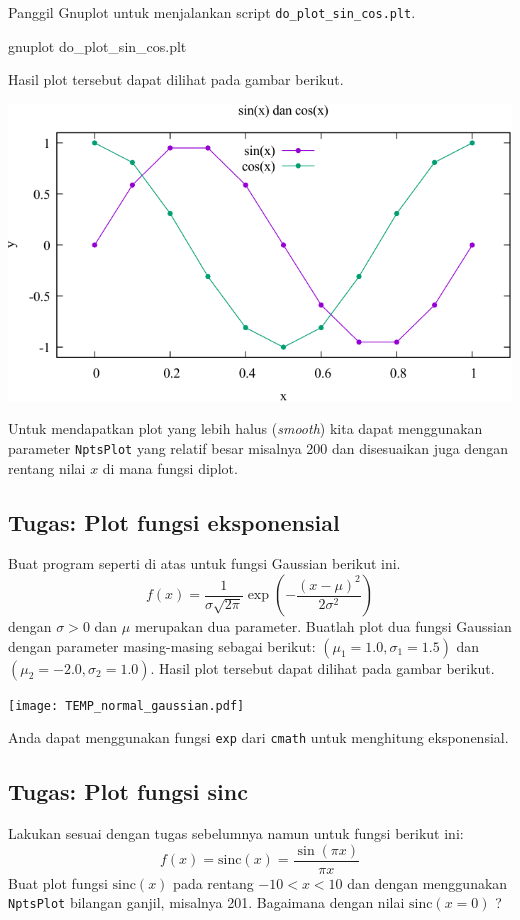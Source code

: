 \documentclass[a4paper,11pt]{extarticle}
\begin{document}
Panggil \textsf{Gnuplot} untuk menjalankan script \texttt{do\_plot\_sin\_cos.plt}.
\begin{textcode}
gnuplot do_plot_sin_cos.plt
\end{textcode}

Hasil plot tersebut dapat dilihat pada gambar berikut.

{\centering
\includegraphics[scale=1.0]{sin_cos.pdf}
\par
}

Untuk mendapatkan plot yang lebih halus (\textit{smooth}) kita dapat menggunakan
parameter \texttt{NptsPlot} yang relatif besar misalnya 200 dan disesuaikan juga
dengan rentang nilai $x$ di mana fungsi diplot.


\subsection{Tugas: Plot fungsi eksponensial}

Buat program seperti di atas untuk fungsi Gaussian berikut ini.
\begin{equation}
f(x) = \frac{1}{\sigma\sqrt{2\pi}}\exp\left(-\frac{(x-\mu)^2}{2\sigma^2}\right)
\end{equation}
dengan $\sigma > 0$ dan $\mu$ merupakan dua parameter.
Buatlah plot dua fungsi Gaussian
dengan parameter masing-masing sebagai berikut:
$(\mu_{1}=1.0,\sigma_{1}=1.5)$ dan $(\mu_{2}=-2.0,\sigma_{2}=1.0)$.
Hasil plot tersebut dapat dilihat pada gambar berikut.

{\centering
\texttt{[image: TEMP\_normal\_gaussian.pdf]}
\par}

Anda dapat menggunakan fungsi \texttt{exp} dari \texttt{cmath}
untuk menghitung eksponensial.

\subsection{Tugas: Plot fungsi sinc}
Lakukan sesuai dengan tugas sebelumnya namun untuk fungsi berikut ini:
\begin{equation}
f(x) = \mathrm{sinc}(x) = \frac{\sin(\pi x)}{\pi x}
\end{equation}
Buat plot fungsi $\mathrm{sinc}(x)$ pada rentang $-10 < x < 10$
dan dengan menggunakan \texttt{NptsPlot} bilangan ganjil, misalnya 201.
Bagaimana dengan nilai $\mathrm{sinc}(x=0)$ ?
\end{document}
